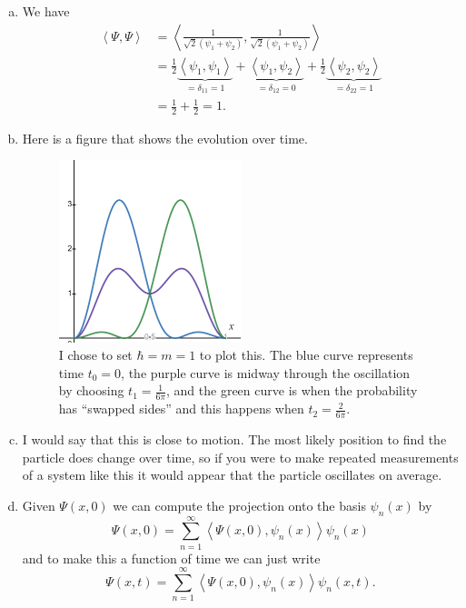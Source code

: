 \documentclass[12pt]{article} %
\newcommand{\innprod}[2]{\left\langle #1,#2 \right\rangle}
\begin{document}
\begin{solution}
\begin{enumerate}[(a)]
\item We have
\begin{align*}
	\innprod{\Psi}{\Psi} &= \innprod{\frac{1}{\sqrt{2}(\psi_1 + \psi_2)}}{\frac{1}{\sqrt{2}(\psi_1 + \psi_2)}}\\
	&= \frac{1}{2}\underbrace{\innprod{\psi_1}{\psi_1}}_{=\delta_{11} = 1} +  \underbrace{\innprod{\psi_1}{\psi_2}}_{=\delta_{12} = 0} + \frac{1}{2}\underbrace{\innprod{\psi_2}{\psi_2}}_{=\delta_{22} = 1}\\
	&= \frac{1}{2} + \frac{1}{2} = 1.
\end{align*}

\item Here is a figure that shows the evolution over time.
\begin{figure}[H]
	\centering
	\includegraphics[width=0.5\textwidth]{figures/time_dependent_superposition.png}
	\caption{I chose to set $\hbar=m=1$ to plot this. The blue curve represents time $t_0=0$, the purple curve is midway through the oscillation by choosing $t_1= \frac{1}{6\pi}$, and the green curve is when the probability has ``swapped sides'' and this happens when $t_2=\frac{2}{6\pi}$.}
\end{figure}

\item I would say that this is close to motion. The most likely position to find the particle does change over time, so if you were to make repeated measurements of a system like this it would appear that the particle oscillates on average.

\item Given $\Psi(x,0)$ we can compute the projection onto the basis $\psi_n(x)$ by
\[
\Psi(x,0) = \sum_{n=1}^\infty \innprod{\Psi(x,0)}{\psi_n(x)} \psi_n(x)
\]
and to make this a function of time we can just write
\[
\Psi(x,t) = \sum_{n=1}^\infty \innprod{\Psi(x,0)}{\psi_n(x)} \psi_n(x,t).
\]
\end{enumerate}
\end{solution}
\end{document}
